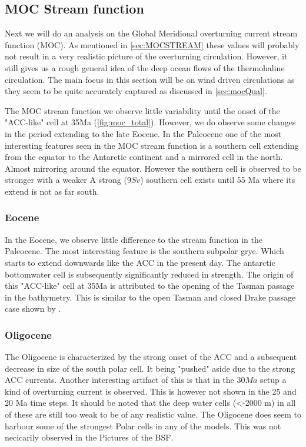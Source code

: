 \subsection{MOC Stream function}

Next we will do an analysis on the Global Meridional overturning current stream function (MOC). As mentioned in \cref{sec:MOCSTREAM} these values will probably not result in a very realistic picture of the overturning circulation. However, it still gives us a rough general idea of the deep ocean flows of the thermohaline circulation. The main focus in this section will be on wind driven circulations as they seem to be quite accurately captured as discussed in \cref{sec:mocQual}. 

The MOC stream function we observe little variability until the onset of the "ACC-like" cell at 35Ma (\cref{fig:moc_total}). However, we do observe some changes in the period extending to the late Eocene. In the Paleocene one of the most interesting features seen in the MOC stream function is a southern cell extending from the equator to the Antarctic continent and a mirrored cell in the north. Almost mirroring around the equator. However the southern cell is observed to be stronger with a weaker  A strong ($9 Sv$) southern cell exists until 55 Ma where its extend is not as far south.

\subsubsection{Eocene}\label{sec:eocenemoc}
In the Eocene, we observe little difference to the stream function in the Paleocene. The most interesting feature is the southern subpolar grye. Which starts to extend downwards like the ACC in the present day. The antarctic bottomwater cell is subsequently significantly reduced in strength.
The origin of this "ACC-like" cell at 35Ma is attributed to the opening of the Tasman passage in the bathymetry. This is similar to the open Tasman and closed Drake passage case shown by \cite{Sijp2011Dec}.  

\subsubsection{Oligocene}
The Oligocene is characterized by the strong onset of the ACC and a subsequent decrease in size of the south polar cell. It being "pushed" aside due to the strong ACC currents. Another interesting artifact of this is that in the $30 Ma$ setup a kind of overturning current is observed. This is however not shown in the 25 and 20 Ma time steps. It should be noted that the deep water cells (<-2000 m) in all of these are still too weak to be of any realistic value. The Oligocene does seem to harbour some of the strongest Polar cells in any of the models. This was not necicarily observed in the Pictures of the BSF.


